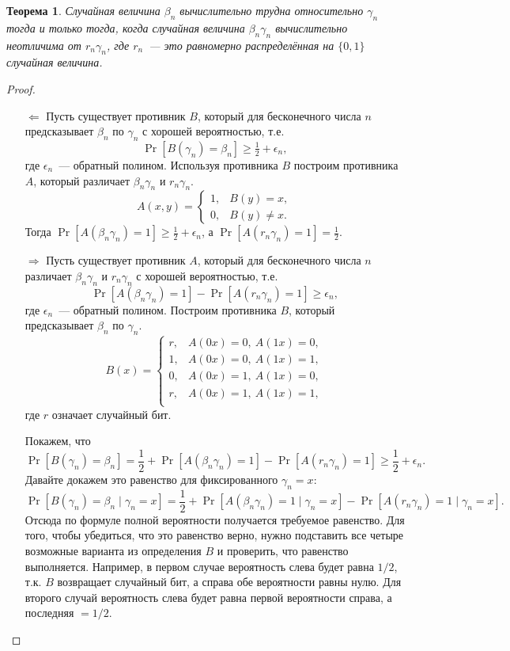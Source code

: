 \documentclass[12pt,a4paper]{article}
\newcommand{\bits}{\{0,1\}}
\theoremstyle{definition}
\theoremstyle{plain}
\newtheorem{theorem}{Теорема}[section]
\theoremstyle{remark}
\begin{document}
\begin{theorem}\label{thm:hard-random-value}
Случайная величина $\beta_n$ вычислительно трудна относительно $\gamma_n$ тогда и только тогда,
когда случайная величина $\beta_n\gamma_n$ вычислительно неотличима от $r_n\gamma_n$, 
где $r_n$~--- это равномерно распределённая на $\bits$ случайная величина.
\end{theorem}
\begin{proof}\mbox{}
\begin{itemize}
\item[$\Leftarrow$] Пусть существует противник $B$, который для бесконечного числа $n$
предсказывает $\beta_n$ по $\gamma_n$ с хорошей вероятностью, т.е.
$$\Pr[B(\gamma_n) = \beta_n]\ge \tfrac12 + \epsilon_n,$$
где $\epsilon_n$~--- обратный полином.
Используя противника $B$ построим противника $A$, который различает $\beta_n\gamma_n$ и $r_n\gamma_n$.
$$A(x,y) = 
\begin{cases}
1, & B(y) = x,\\
0, & B(y) \neq x.
\end{cases}
$$
Тогда $\Pr[A(\beta_n\gamma_n) = 1]\ge\frac12 + \epsilon_n$, а $\Pr[A(r_n\gamma_n) = 1] = \frac12$.

\item[$\Rightarrow$] Пусть существует противник $A$, который для бесконечного числа $n$ 
различает $\beta_n\gamma_n$ и $r_n\gamma_n$ с хорошей вероятностью, т.е.
$$\Pr[A(\beta_n\gamma_n) = 1] - \Pr[A(r_n\gamma_n) = 1]\ge\epsilon_n,$$
где $\epsilon_n$~--- обратный полином.  Построим противника $B$, который предсказывает $\beta_n$ по $\gamma_n$.
$$B(x) = 
\begin{cases}
r, & A(0x) = 0,\ A(1x) = 0,\\
1, & A(0x) = 0,\ A(1x) = 1,\\
0, & A(0x) = 1,\ A(1x) = 0,\\
r, & A(0x) = 1,\ A(1x) = 1,\\
\end{cases}
$$
где $r$ означает случайный бит.

Покажем, что 
$$\Pr[B(\gamma_n) = \beta_n] = \frac12 + \Pr[A(\beta_n\gamma_n) = 1] - \Pr[A(r_n\gamma_n) = 1] \ge \frac12 + \epsilon_n.$$
Давайте докажем это равенство для фиксированного $\gamma_n = x$:
$$\Pr[B(\gamma_n) = \beta_n\mid \gamma_n = x] = 
  \frac12 + \Pr[A(\beta_n\gamma_n) = 1\mid \gamma_n = x] - \Pr[A(r_n\gamma_n) = 1\mid \gamma_n = x].$$
Отсюда по формуле полной вероятности получается требуемое равенство. Для того, чтобы убедиться,
что это равенство верно, нужно подставить все четыре возможные варианта из определения $B$
и проверить, что равенство выполняется. Например, в первом случае вероятность слева будет равна $1/2$,
т.к. $B$ возвращает случайный бит, а справа обе вероятности равны нулю. Для второго случай вероятность
слева будет равна первой вероятности справа, а последняя $=1/2$.


\end{itemize}
\end{proof}
\end{document}
